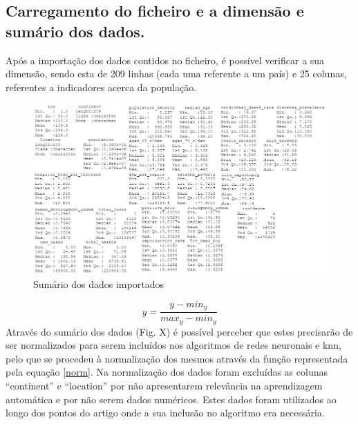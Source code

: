 \documentclass[conference]{IEEEtran}
\begin{document}
\subsection{Carregamento do ficheiro e a dimensão e sumário dos dados.} 
\label{ex01}
Após a importação dos dados contidos no ficheiro, é possível verificar a sua dimensão, sendo esta de 209 linhas (cada uma referente a um país) e 25 colunas, referentes a indicadores acerca da população.
\begin{figure}[htbp]
\centerline{\includegraphics[width=0.95\columnwidth]{images/01.png}}
\caption{Sumário dos dados importados}
\label{summary}
\end{figure}
\begin{equation}
y = \frac{y-min_{y}}{max_{y}-min_{y}} \label{norm}
\end{equation}
Através do sumário dos dados (Fig. X) é possível perceber que estes precisarão de ser normalizados para serem incluídos nos algoritmos de redes neuronais e knn, pelo que se procedeu à normalização dos mesmos através da função representada pela equação \eqref{norm}.
Na normalização dos dados foram excluídas as colunas “continent” e “location” por não apresentarem relevância na aprendizagem automática e por não serem dados numéricos. Estes dados foram utilizados ao longo dos pontos do artigo onde a sua inclusão no algoritmo era necessária.
\end{document}
